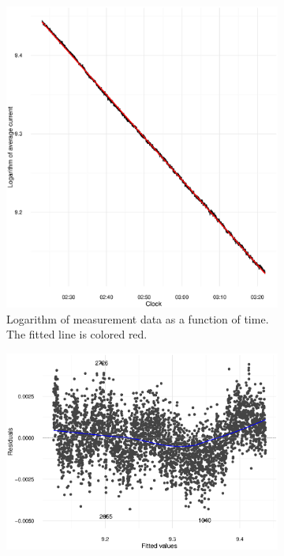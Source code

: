 \documentclass[reprint]{revtex4-1}
\newcommand{\scl}{.43}
\begin{document}
\begin{figure}
\centering
\begin{subfigure}{.5\textwidth}
\includegraphics[scale=\scl]{img/Run969_Data_AND_Fit.eps}
\caption{Logarithm of measurement data as a function of time. The fitted line is colored red.}
\end{subfigure}
\begin{subfigure}{.5\textwidth}
\includegraphics[scale=\scl]{img/Run969_Res_VS_Fit.eps}

\end{subfigure}
\end{figure}
\end{document}
